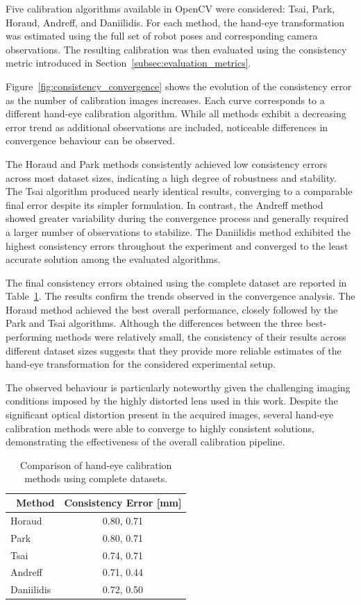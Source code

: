 Five calibration algorithms available in OpenCV were considered: Tsai, Park, Horaud, Andreff, and Daniilidis. For each method, the hand-eye transformation was estimated using the full set of robot poses and corresponding camera observations. The resulting calibration was then evaluated using the consistency metric introduced in Section~\ref{subsec:evaluation_metrics}.

Figure~\ref{fig:consistency_convergence} shows the evolution of the consistency error as the number of calibration images increases. Each curve corresponds to a different hand-eye calibration algorithm. While all methods exhibit a decreasing error trend as additional observations are included, noticeable differences in convergence behaviour can be observed.

The Horaud and Park methods consistently achieved low consistency errors across most dataset sizes, indicating a high degree of robustness and stability. The Tsai algorithm produced nearly identical results, converging to a comparable final error despite its simpler formulation. In contrast, the Andreff method showed greater variability during the convergence process and generally required a larger number of observations to stabilize. The Daniilidis method exhibited the highest consistency errors throughout the experiment and converged to the least accurate solution among the evaluated algorithms.

The final consistency errors obtained using the complete dataset are reported in Table~\ref{tab:handeye_comparison}. The results confirm the trends observed in the convergence analysis. The Horaud method achieved the best overall performance, closely followed by the Park and Tsai algorithms. Although the differences between the three best-performing methods were relatively small, the consistency of their results across different dataset sizes suggests that they provide more reliable estimates of the hand-eye transformation for the considered experimental setup.

The observed behaviour is particularly noteworthy given the challenging imaging conditions imposed by the highly distorted lens used in this work. Despite the significant optical distortion present in the acquired images, several hand-eye calibration methods were able to converge to highly consistent solutions, demonstrating the effectiveness of the overall calibration pipeline.

\begin{table}[htbp]
	\centering
	\caption{Comparison of hand-eye calibration methods using complete datasets.}
	\label{tab:handeye_comparison}
	\begin{tabular}{lc}
		\toprule\
		Method & Consistency Error [mm] \\
		\midrule
		Horaud & 0.80, 0.71\\
		Park & 0.80, 0.71\\
		Tsai & 0.74, 0.71\\
		Andreff & 0.71, 0.44 \\
		Daniilidis & 0.72, 0.50 \\
		\bottomrule
	\end{tabular}
\end{table}



